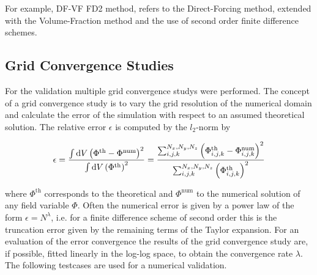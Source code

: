 For example, DF-VF FD2 method, refers to the Direct-Forcing method, extended with the Volume-Fraction
method and the use of second order finite difference schemes.

\subsection{Grid Convergence Studies}

For the validation multiple grid convergence studys were performed.
The concept of a grid convergence study is to vary the grid resolution of the numerical domain and
calculate the error of the simulation with respect to an assumed theoretical solution.
The relative error $\epsilon$ is computed by the $l_2$-norm by

\begin{align}
    \epsilon = \frac{\int \mathop{}\!\mathrm{d} V \left(\Phi^{\text{th}} - \Phi^{\text{num}}\right)^2}{\int \mathop{}\!\mathrm{d} V \left( \Phi^{\text{th}} \right)^2}
     = \frac{\sum_{i,j,k}^{N_x, N_y, N_z}
      \left(\Phi^{\text{th}}_{i,j,k}  - \Phi^{\text{num}}_{i, j, k}  \right)^2}
     {\sum_{i,j,k}^{N_x, N_y, N_z} \left( \Phi^{\text{th}}_{i,j,k} \right)^2}
 \end{align}

where $\Phi^{\text{th}}$ corresponds to the theoretical and $\Phi^{\text{num}}$ to the numerical solution of any field variable $\Phi$.
Often the numerical error is given by a power law of the form $\epsilon = N^\lambda$, i.e. for a finite difference scheme of second order
this is the truncation error given by the remaining terms  of the Taylor expansion.
For an evaluation of the error convergence the results of the grid convergence study are, if possible, fitted linearly in the log-log space, to obtain the
convergence rate $\lambda$.
The following testcases are used for a numerical validation.


